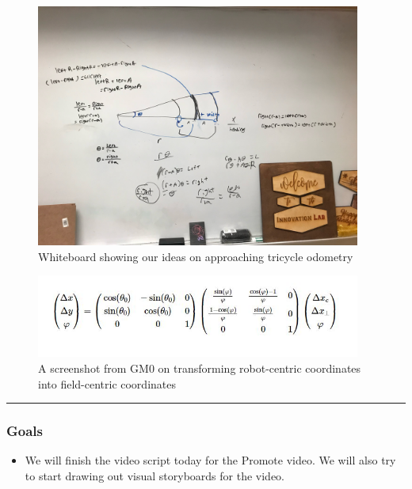 \begin{figure}[htp]
\centering
  \includegraphics[width=0.95\textwidth]{Meetings/January/01-06-22/1.6.22 Board with Odometry - James Hu.jpg}
  \caption{Whiteboard showing our ideas on approaching tricycle odometry}
  \label{fig:010622_1}
\end{figure}

\begin{figure}[htp]
\centering
  \includegraphics[width=0.95\textwidth]{Meetings/January/01-06-22/1.6.22 Corrected Pose Equation - James Hu.JPG}
  \caption{A screenshot from GM0 on transforming robot-centric coordinates into field-centric coordinates}
  \label{fig:010622_2}
\end{figure}

\noindent\hfil\rule{\textwidth}{.4pt}\hfil
\subsubsection*{Goals}
\begin{itemize}
    \item We will finish the video script today for the Promote video. We will also try to start drawing out visual storyboards for the video.

\end{itemize} 

